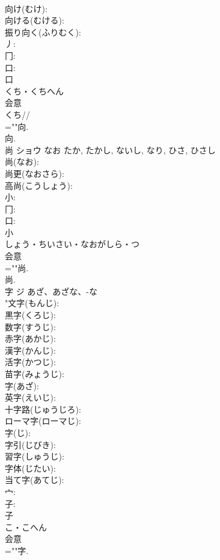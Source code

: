 \documentclass[8pt]{extreport}
\begin{document}
\begin{CJK}{UTF8}{min}
\\	向け(むけ): 
\\	向ける(むける): 
\\	振り向く(ふりむく): 
\\	丿: 
\\	冂: 
\\	口: 
\\	口	
\\	くち・くちへん	
\\	会意 
\\	くち// 
\\	=""向.
\\	向.
\\	尚	ショウ	なお	たか, たかし, ないし, なり, ひさ, ひさし	
\\	尚(なお): 
\\	尚更(なおさら): 
\\	高尚(こうしょう): 
\\	小: 
\\	冂: 
\\	口: 
\\	小	
\\	しょう・ちいさい・なおがしら・つ	
\\	会意 
\\	=""尚.
\\	尚.
\\	字	ジ	あざ、あざな、-な		
\\	"文字(もんじ): 
\\	黒字(くろじ): 
\\	数字(すうじ): 
\\	赤字(あかじ): 
\\	漢字(かんじ): 
\\	活字(かつじ): 
\\	苗字(みょうじ): 
\\	字(あざ): 
\\	英字(えいじ): 
\\	十字路(じゅうじろ): 
\\	ローマ字(ローマじ): 
\\	字(じ): 
\\	字引(じびき): 
\\	習字(しゅうじ): 
\\	字体(じたい): 
\\	当て字(あてじ): 
\\	宀: 
\\	子: 
\\	子	
\\	こ・こへん	
\\	会意 
\\	=""字.

\end{CJK}
\end{document}
